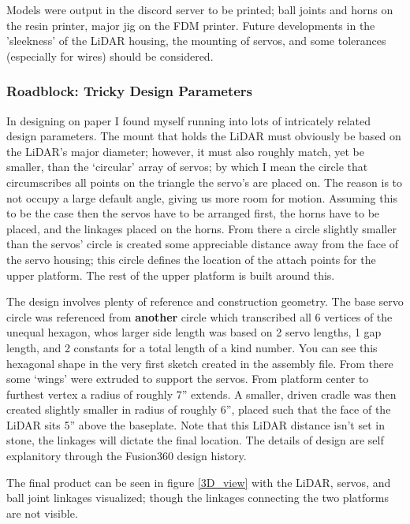 \documentclass[a4paper, 10pt]{article}
\begin{document}
		Models were output in the discord server to be printed; ball joints and horns on the resin printer, major jig on the FDM printer. Future developments in the 'sleekness' of the LiDAR housing, the mounting of servos, and some tolerances (especially for wires) should be considered.
		
		\subsubsection{Roadblock: Tricky Design Parameters}
		In designing on paper I found myself running into lots of intricately related design parameters. The mount that holds the LiDAR must obviously be based on the LiDAR's major diameter; however, it must also roughly match, yet be smaller, than the `circular' array of servos; by which I mean the circle that circumscribes all points on the triangle the servo's are placed on. The reason is to not occupy a large default angle, giving us more room for motion. Assuming this to be the case then the servos have to be arranged first, the horns have to be placed, and the linkages placed on the horns. From there a circle slightly smaller than the servos' circle is created some appreciable distance away from the face of the servo housing; this circle defines the location of the attach points for the upper platform. The rest of the upper platform is built around this.
		
		The design involves plenty of reference and construction geometry. The base servo circle was referenced from \textbf{another} circle which transcribed all 6 vertices of the unequal hexagon, whos larger side length was based on 2 servo lengths, 1 gap length, and 2 constants for a total length of a kind number. You can see this hexagonal shape in the very first sketch created in the assembly file. From there some `wings' were extruded to support the servos. From platform center to furthest vertex a radius of roughly 7'' extends. A smaller, driven cradle was then created slightly smaller in radius of roughly 6'', placed such that the face of the LiDAR sits 5'' above the baseplate. Note that this LiDAR distance isn't set in stone, the linkages will dictate the final location. The details of design are self explanitory through the Fusion360 design history.

\clearpage

		The final product can be seen in figure \ref{3D_view} with the LiDAR, servos, and ball joint linkages visualized; though the linkages connecting the two platforms are not visible.
		
\end{document}
